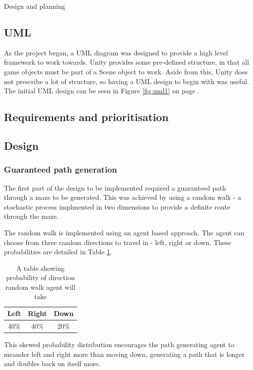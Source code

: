 \documentclass[progress]{cmpreport}
\begin{document}
\begin{section}{Design and planning}
\subsection{UML}

As the project began, a UML diagram was designed to provide a high level framework to work towards. Unity provides some pre-defined structure, in that all game objects must be part of a Scene object to work. Aside from this, Unity does not prescribe a lot of structure, so having a UML design to begin with was useful. The initial UML design can be seen in Figure \ref{fig:uml1} on page \pageref{fig:uml1}.




\subsection{Requirements and prioritisation}

\subsection{Design}
\subsubsection{Guaranteed path generation}
The first part of the design to be implemented required a guaranteed path through a maze to be generated. This was achieved by using a random walk - a stochastic process implmented in two dimensions to provide a definite route through the maze.

The random walk is implemented using an agent based approach. The agent can choose from three random directions to travel in - left, right or down. These probabilities are detailed in Table \ref{tab:probdirs}.

\begin{table}[h!]
    \centering
    \begin{tabular}{ |c|c|c| }
    \hline
    Left & Right & Down \\ 
    \hline
    40\% & 40\% & 20\%\\ 
    \hline
    \end{tabular}
    \caption{A table showing probability of direction random walk agent will take}
    \label{tab:probdirs}
    \end{table}

This skewed probability distribution encourages the path generating agent to meander left and right more than moving down, generating a path that is longer and doubles back on itself more.



\end{section}
\end{document}
